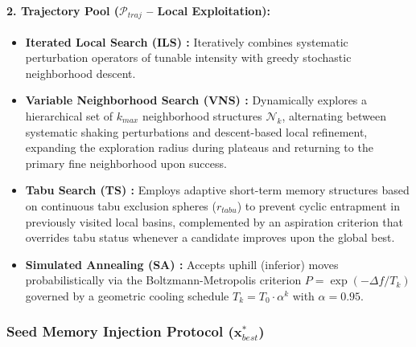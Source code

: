 \paragraph{2. Trajectory Pool ($\mathcal{P}_{traj}$ -- Local Exploitation):}
\begin{itemize}
    \item \textbf{Iterated Local Search (ILS) \cite{lourenco2003iterated}:} Iteratively combines systematic perturbation operators of tunable intensity with greedy stochastic neighborhood descent.
    \item \textbf{Variable Neighborhood Search (VNS) \cite{mladenovic1997variable}:} Dynamically explores a hierarchical set of $k_{max}$ neighborhood structures $\mathcal{N}_k$, alternating between systematic shaking perturbations and descent-based local refinement, expanding the exploration radius during plateaus and returning to the primary fine neighborhood upon success.
    \item \textbf{Tabu Search (TS) \cite{glover1986future}:} Employs adaptive short-term memory structures based on continuous tabu exclusion spheres ($r_{tabu}$) to prevent cyclic entrapment in previously visited local basins, complemented by an aspiration criterion that overrides tabu status whenever a candidate improves upon the global best.
    \item \textbf{Simulated Annealing (SA) \cite{kirkpatrick1983optimization}:} Accepts uphill (inferior) moves probabilistically via the Boltzmann-Metropolis criterion $P = \exp(-\Delta f / T_k)$ governed by a geometric cooling schedule $T_k = T_0 \cdot \alpha^k$ with $\alpha = 0.95$.
\end{itemize}

\subsubsection{Seed Memory Injection Protocol ($\mathbf{x}_{best}^*$)}

